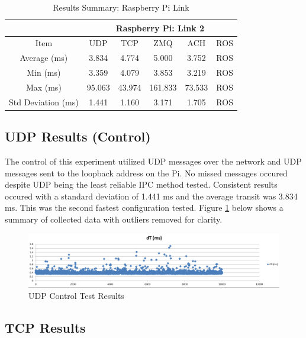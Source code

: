 \begin{table}[h]
\caption{Results Summary: Raspberry Pi Link}
\label{table:results summary rpi}
\begin{center}
\begin{tabular}{c|c||c||c||c||c|}
\cline{2-6}
& \multicolumn{5}{c|}{Raspberry Pi: Link 2}\\
\hline
\multicolumn{1}{|c|}{Item} & UDP & TCP & ZMQ & ACH  & ROS\\
\hline
\multicolumn{1}{|c|}{Average (ms)} & 3.834 & 4.774 & 5.000 & 3.752 & ROS\\
\hline
\multicolumn{1}{|c|}{Min (ms)} & 3.359 & 4.079 & 3.853 & 3.219 & ROS\\
\hline
\multicolumn{1}{|c|}{Max (ms)} & 95.063 & 43.974 & 161.833 & 73.533 & ROS\\
\hline
\multicolumn{1}{|c|}{Std Deviation (ms)} & 1.441 & 1.160 & 3.171 & 1.705 & ROS\\
\hline
\end{tabular}
\end{center} 
\end{table}

\subsection{UDP Results (Control)}

The control of this experiment utilized UDP messages over the network and UDP messages sent to the loopback address on the Pi. No missed messages occured despite UDP being the least reliable IPC method tested. Consistent results occured with a standard deviation of 1.441 ms and the average transit was 3.834 ms. This was the second fastest configuration tested. Figure \ref{fig:UDP results} below shows a summary of collected data with outliers removed for clarity.

\begin{figure}[thpb]
 \centering
 \includegraphics[width=1.0\columnwidth]{./images/udp2udp.png}
  \caption{UDP Control Test Results}  
  \label{fig:UDP results}
\end{figure} 

\subsection{TCP Results}

